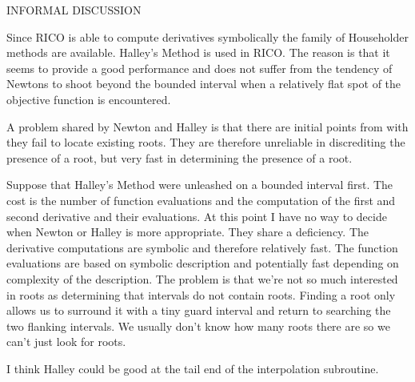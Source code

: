 INFORMAL DISCUSSION

Since RICO is able to compute derivatives symbolically the family of Householder methods are available. 
Halley's Method is used in RICO. The reason is that it seems to provide a good performance and does not suffer from the tendency of Newtons to shoot beyond the bounded interval when a relatively flat spot of the objective function is encountered.

A problem shared by Newton and Halley is that there are initial points from with they fail to locate existing roots. They are therefore unreliable in discrediting the presence of a root, but very fast in determining the presence of a root.

Suppose that Halley's Method were unleashed on a bounded interval first. The cost is the number of function evaluations and the computation of the first and second derivative and their evaluations. At this point I have no way to decide when Newton or Halley is more appropriate. They share a deficiency. The derivative computations are symbolic and therefore relatively fast. The function evaluations are based on symbolic description and potentially fast depending on complexity of the description. The problem is that we're not so much interested in roots as determining that intervals do not contain roots. Finding a root only allows us to surround it with a tiny guard interval and return to searching the two flanking intervals. We usually don't know how many roots there are so we can't just look for roots.

I think Halley could be good at the tail end of the interpolation subroutine. 
